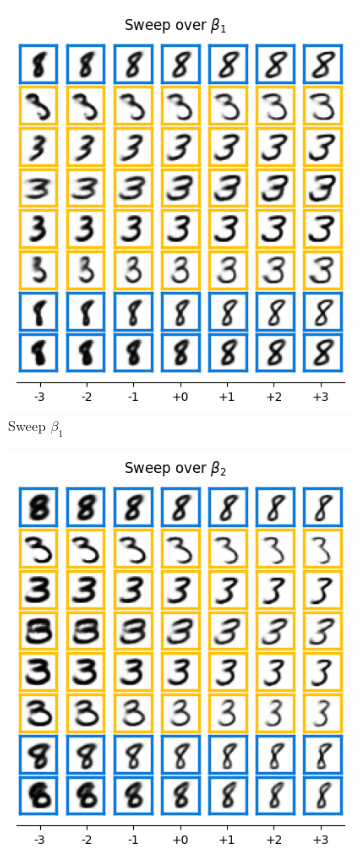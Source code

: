 \begin{figure}[t]
\begin{subfigure}[t]{.23\linewidth}
		\includegraphics[width=.9\textwidth]{../openreview/pictures/Figure3/beta_1.png}
		\caption{Sweep $\beta_1$}
	\end{subfigure}
	\begin{subfigure}[t]{.23\linewidth}
		\includegraphics[width=.9\textwidth]{../openreview/pictures/Figure3/beta_2.png}

\end{subfigure}
\end{figure}

